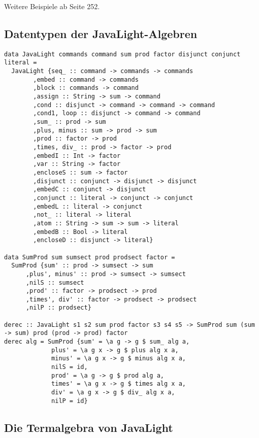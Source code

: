 \documentclass[11pt]{article}
\begin{document}
Weitere Beispiele ab Seite 252.

\subsection{Datentypen der JavaLight-Algebren}
\label{sec-11-2}

\begin{verbatim}
data JavaLight commands command sum prod factor disjunct conjunct literal =
  JavaLight {seq_ :: command -> commands -> commands
	    ,embed :: command -> commands
	    ,block :: commands -> command
	    ,assign :: String -> sum -> command
	    ,cond :: disjunct -> command -> command -> command
	    ,cond1, loop :: disjunct -> command -> command
	    ,sum_ :: prod -> sum
	    ,plus, minus :: sum -> prod -> sum
	    ,prod :: factor -> prod
	    ,times, div_ :: prod -> factor -> prod
	    ,embedI :: Int -> factor
	    ,var :: String -> factor
	    ,encloseS :: sum -> factor
	    ,disjunct :: conjunct -> disjunct -> disjunct
	    ,embedC :: conjunct -> disjunct
	    ,conjunct :: literal -> conjunct -> conjunct
	    ,embedL :: literal -> conjunct
	    ,not_ :: literal -> literal
	    ,atom :: String -> sum -> sum -> literal
	    ,embedB :: Bool -> literal
	    ,encloseD :: disjunct -> literal}

data SumProd sum sumsect prod prodsect factor =
  SumProd {sum' :: prod -> sumsect -> sum
	  ,plus', minus' :: prod -> sumsect -> sumsect
	  ,nilS :: sumsect
	  ,prod' :: factor -> prodsect -> prod
	  ,times', div' :: factor -> prodsect -> prodsect
	  ,nilP :: prodsect}

derec :: JavaLight s1 s2 sum prod factor s3 s4 s5 -> SumProd sum (sum -> sum) prod (prod -> prod) factor
derec alg = SumProd {sum' = \a g -> g $ sum_ alg a,
		     plus' = \a g x -> g $ plus alg x a,
		     minus' = \a g x -> g $ minus alg x a,
		     nilS = id,
		     prod' = \a g -> g $ prod alg a,
		     times' = \a g x -> g $ times alg x a,
		     div' = \a g x -> g $ div_ alg x a,
		     nilP = id}
\end{verbatim}


\subsection{Die Termalgebra von JavaLight}
\label{sec-11-3}
\end{document}
